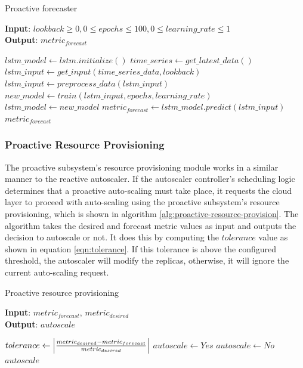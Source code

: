 \begin{algorithm}
    \caption{Proactive forecaster}
    \label{alg:proactive-forecast-alg}
    \textbf{Input}: $lookback \geq 0, 0 \leq epochs \leq 100, 0 \leq learning\_rate \leq 1$\\
    \textbf{Output}: $metric_{forecast}$
    \begin{algorithmic}
        \State $lstm\_model \gets lstm.initialize()$
        \State $time\_series \gets get\_latest\_data()$
        \State $lstm\_input \gets get\_input(time\_series\_data, lookback)$
        \State $lstm\_input \gets preprocess\_data(lstm\_input)$
        \State $new\_model \gets train(lstm\_input, epochs, learning\_rate)$
            \State $lstm\_model \gets new\_model$
        \EndIf
        \State $metric_{forecast} \gets lstm\_model.predict(lstm\_input)$
        \State \Return $metric_{forecast}$
    \end{algorithmic}
\end{algorithm}

\subsubsection{Proactive Resource Provisioning}

The proactive subsystem's resource provisioning module works in a similar manner to the reactive autoscaler. If the autoscaler controller's scheduling logic determines that a proactive auto-scaling must take place, it requests the cloud layer to proceed with auto-scaling using the proactive subsystem's resource provisioning, which is shown in algorithm \ref{alg:proactive-resource-provision}. The algorithm takes the desired and forecast metric values as input and outputs the decision to autoscale or not. It does this by computing the $tolerance$ value as shown in equation \ref{eqn:tolerance}. If this tolerance is above the configured threshold, the autoscaler will modify the replicas, otherwise, it will ignore the current auto-scaling request.\par

\begin{algorithm}
    \caption{Proactive resource provisioning}
    \label{alg:proactive-resource-provision}
    \textbf{Input}: $metric_{forecast},\, metric_{desired}$\\
    \textbf{Output}: $autoscale$
    \begin{algorithmic}
        \State $tolerance \gets \abs{ \frac{metric_{desired} - metric_{forecast}}{metric_{desired}} }$
            \State $autoscale \gets Yes$
        \Else
            \State $autoscale \gets No$
        \EndIf
        \State \Return $autoscale$
    \end{algorithmic}
\end{algorithm}

